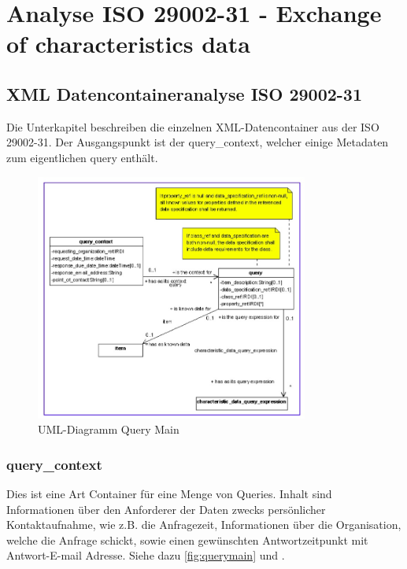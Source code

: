 \chapter{Analyse ISO 29002-31 - Exchange of characteristics data}\label{kap:analyse2900231}

\section{XML Datencontaineranalyse ISO 29002-31}
Die Unterkapitel beschreiben die einzelnen XML-Datencontainer aus der ISO 29002-31. Der Ausgangspunkt ist der query\_context, welcher einige Metadaten zum eigentlichen query enthält. 

\begin{figure}[htbp]
	\centering
		\includegraphics[width=0.80\textwidth]{images/query_main.jpg}
		\caption[UML-Diagramm Query Main]{UML-Diagramm Query Main\footnotemark}
	\label{fig:querymain}
\end{figure}

\subsection{query\_context}
Dies ist eine Art Container für eine Menge von Queries. Inhalt sind Informationen über den Anforderer der Daten zwecks persönlicher Kontaktaufnahme, wie z.B. die Anfragezeit, Informationen über die Organisation, welche die Anfrage schickt, sowie einen gewünschten Antwortzeitpunkt mit Antwort-E-mail Adresse. Siehe dazu \autoref{fig:querymain} und \citep[vgl][Kap. 5.2.2]{iso29002-31}.  

